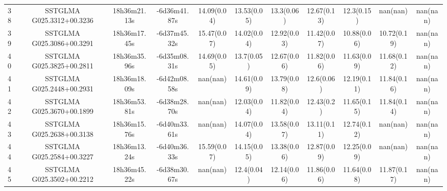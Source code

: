 \begin{table}
{\begin{tabular}[c]{lcccccccccc}
38 & SSTGLMA G025.3312+00.3236 & 18h36m21.13s & -6d36m41.87s & 14.09(0.04) & 13.53(0.05) & 13.3(0.06)  & 12.67(0.13) & 12.3(0.15)  & nan(nan)    & nan(nan) \\
39 & SSTGLMA G025.3086+00.3291 & 18h36m17.45s & -6d37m45.32s & 15.47(0.07) & 14.02(0.04) & 12.92(0.03) & 11.42(0.07) & 10.88(0.06) & 10.72(0.19) & nan(nan) \\
40 & SSTGLMA G025.3825+00.2811 & 18h36m35.96s & -6d35m08.31s & 14.69(0.05) & 13.7(0.05)  & 12.67(0.06) & 11.82(0.06) & 11.63(0.09) & 11.68(0.12) & nan(nan) \\
41 & SSTGLMA G025.2448+00.2931 & 18h36m18.09s & -6d42m08.58s & nan(nan)    & 14.61(0.09) & 13.79(0.08) & 12.6(0.06)  & 12.19(0.11) & 11.84(0.16) & nan(nan) \\
42 & SSTGLMA G025.3670+00.1899 & 18h36m53.81s & -6d38m28.70s & nan(nan)    & 12.03(0.04) & 11.82(0.04) & 12.43(0.2)  & 11.65(0.15) & 11.84(0.14) & nan(nan) \\
43 & SSTGLMA G025.2638+00.3138 & 18h36m15.76s & -6d40m33.61s & nan(nan)    & 14.07(0.04) & 13.58(0.07) & 13.11(0.11) & 12.74(0.12) & nan(nan)    & nan(nan) \\
44 & SSTGLMA G025.2584+00.3227 & 18h36m13.24s & -6d40m36.33s & 15.59(0.07) & 14.15(0.05) & 13.38(0.06) & 12.87(0.09) & 12.25(0.09) & nan(nan)    & nan(nan) \\
45 & SSTGLMA G025.3502+00.2212 & 18h36m45.22s & -6d38m30.67s & nan(nan)    & 12.4(0.04)  &12.14(0.06)  & 11.86(0.06) & 11.64(0.08) & 11.87(0.17) & nan(nan) \\
\hline
\end{tabular}
}
\end{table}